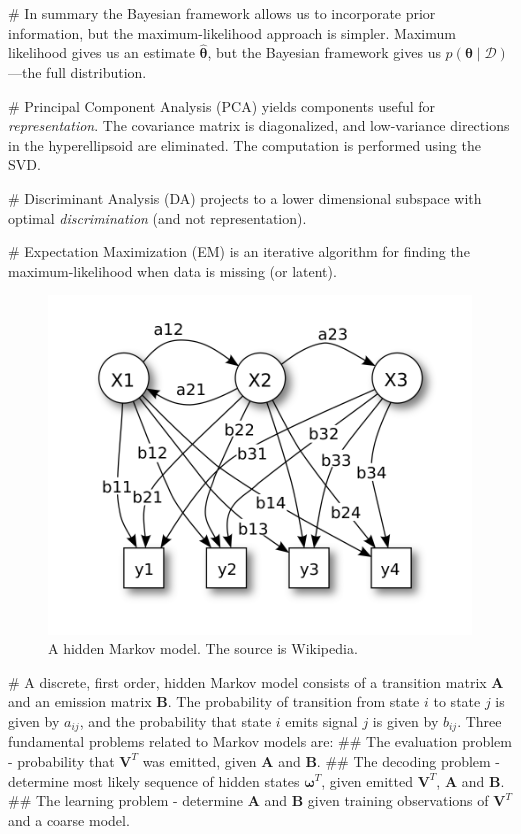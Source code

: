 \documentclass[12pt, a4paper]{article}
\newcommand{\D}{\mathcal{D}}
\newcommand{\vect}[1]{\bm{#1}}
\begin{document}
\begin{easylist}[itemize]
# In summary the Bayesian framework allows us to incorporate prior information, but the maximum-likelihood approach is simpler.
Maximum likelihood gives us an estimate $\hat{\vect{\theta}}$, but the Bayesian framework gives us $p(\vect{\theta}  \mid  \D)$---the full distribution.

# Principal Component Analysis (PCA) yields components useful for \emph{representation}.
The covariance matrix is diagonalized, and low-variance directions in the hyperellipsoid are eliminated.
The computation is performed using the SVD.

# Discriminant Analysis (DA) projects to a lower dimensional subspace with optimal \emph{discrimination} (and not representation).

# Expectation Maximization (EM) is an iterative algorithm for finding the maximum-likelihood when data is missing (or latent).

\begin{figure}[ht!]
	\centering
	\includegraphics[width=0.45\linewidth]{figs/hidden_markov}
	\caption{A hidden Markov model. The source is Wikipedia.}
	\label{fig:hidden_markov}
\end{figure}

# A discrete, first order, hidden Markov model consists of a transition matrix $\vect{A}$ and an emission matrix $\vect{B}$.
The probability of transition from state $i$ to state $j$ is given by $a_{ij}$, and the probability that state $i$ emits signal $j$ is given by $b_{ij}$.
Three fundamental problems related to Markov models are:
## The evaluation problem - probability that $\vect{V}^T$ was emitted, given $\vect{A}$ and $\vect{B}$.
## The decoding problem - determine most likely sequence of hidden states $\vect{\omega}^T$, given emitted $\vect{V}^T$, $\vect{A}$ and $\vect{B}$.
## The learning problem - determine $\vect{A}$ and $\vect{B}$ given training observations of $\vect{V}^T$ and a coarse model.



\end{easylist}
\end{document}
